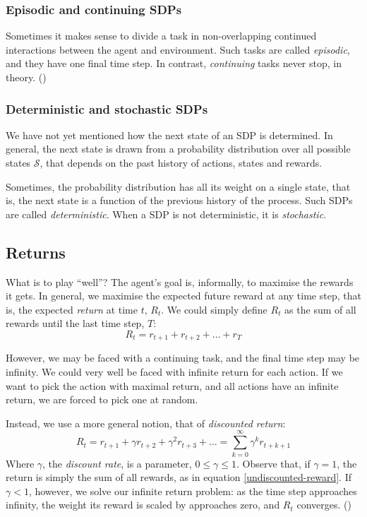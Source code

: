 \subsubsection{Episodic and continuing \acp{SDP}}
Sometimes it makes sense to divide a task in non-overlapping continued
interactions between the agent and environment. Such tasks are called
\emph{episodic}, and they have one final time step. In contrast,
\emph{continuing} tasks never stop, in theory.
(\cite[Section~3.3]{sutton1998introduction})

\subsubsection{Deterministic and stochastic \acp{SDP}}
We have not yet mentioned how the next state of an \ac{SDP} is determined. In
general, the next state is drawn from a probability distribution over all
possible states $\mathcal{S}$, that depends on the past history of actions,
states and rewards.

Sometimes, the probability distribution has all its weight on a single
state, that is, the next state is a function of the previous history of the
process. Such \acp{SDP} are called \emph{deterministic}. When a \ac{SDP} is not
deterministic, it is \emph{stochastic}.

\subsection{Returns}
What is to play ``well''? The agent's goal is, informally, to maximise the rewards it
gets. In general, we maximise the expected future reward at any time step,
that is, the expected \emph{return} at time $t$, $R_t$.
We could simply define $R_t$ as the sum of all rewards until the last time step, $T$:
\begin{equation}
  R_t = r_{t+1} + r_{t+2} + \dots + r_T
  \label{undiscounted-reward}
\end{equation}

However, we may be faced with a continuing task, and the final time step may be
infinity. We could very well be faced with infinite return for each action.
If we want to pick the action with maximal return, and all actions have an
infinite return, we are forced to pick one at random.

Instead, we use a more general notion, that of \emph{discounted return}:
\begin{equation}
  R_t = r_{t+1} + \gamma r_{t+2} + \gamma^2 r_{t+3} + \dots = \sum_{k=0}^\infty
\gamma^k r_{t+k+1}
\end{equation}
Where $\gamma$, the \emph{discount rate}, is a parameter, $0 \leq \gamma \leq
1$. Observe that, if $\gamma=1$, the return is simply the sum of all rewards, as
in equation \ref{undiscounted-reward}. If $\gamma<1$, however, we solve our
infinite return problem: as the time step approaches infinity, the weight its
reward is scaled by approaches zero, and $R_t$ converges.
(\cite[Subsection~17.1.1]{russell2009aima})

